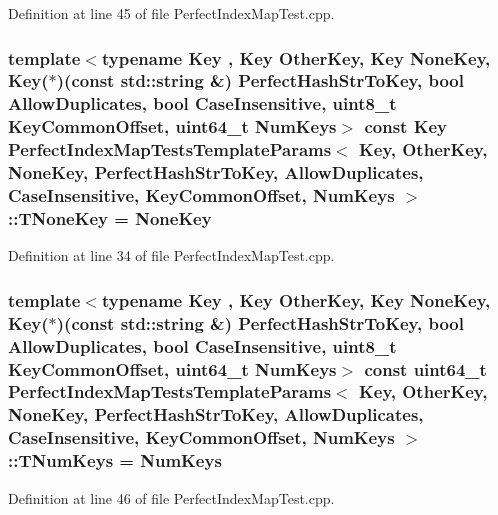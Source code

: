 Definition at line 45 of file Perfect\+Index\+Map\+Test.\+cpp.

\subsubsection[{T\+None\+Key}]{\setlength{\rightskip}{0pt plus 5cm}template$<$typename Key , Key Other\+Key, Key None\+Key, Key($\ast$)(const std\+::string \&) Perfect\+Hash\+Str\+To\+Key, bool Allow\+Duplicates, bool Case\+Insensitive, uint8\+\_\+t Key\+Common\+Offset, uint64\+\_\+t Num\+Keys$>$ const Key {\bf Perfect\+Index\+Map\+Tests\+Template\+Params}$<$ Key, Other\+Key, None\+Key, Perfect\+Hash\+Str\+To\+Key, Allow\+Duplicates, Case\+Insensitive, Key\+Common\+Offset, Num\+Keys $>$\+::T\+None\+Key = None\+Key\hspace{0.3cm}{\ttfamily [static]}}\label{structPerfectIndexMapTestsTemplateParams_a40ac198ed134c4385d6070bdc7957772}


Definition at line 34 of file Perfect\+Index\+Map\+Test.\+cpp.

\subsubsection[{T\+Num\+Keys}]{\setlength{\rightskip}{0pt plus 5cm}template$<$typename Key , Key Other\+Key, Key None\+Key, Key($\ast$)(const std\+::string \&) Perfect\+Hash\+Str\+To\+Key, bool Allow\+Duplicates, bool Case\+Insensitive, uint8\+\_\+t Key\+Common\+Offset, uint64\+\_\+t Num\+Keys$>$ const uint64\+\_\+t {\bf Perfect\+Index\+Map\+Tests\+Template\+Params}$<$ Key, Other\+Key, None\+Key, Perfect\+Hash\+Str\+To\+Key, Allow\+Duplicates, Case\+Insensitive, Key\+Common\+Offset, Num\+Keys $>$\+::T\+Num\+Keys = Num\+Keys\hspace{0.3cm}{\ttfamily [static]}}\label{structPerfectIndexMapTestsTemplateParams_abacc377919ab0e3a8248fb6ed61df06c}


Definition at line 46 of file Perfect\+Index\+Map\+Test.\+cpp.

